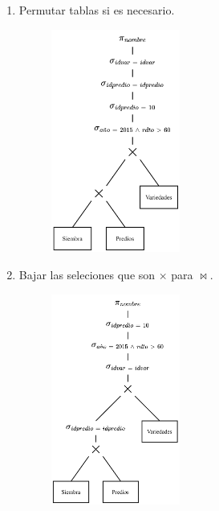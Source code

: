 \documentclass{templateNote}
\begin{document}
\begin{enumerate}
\begin{itemize}
\begin{enumerate}
            \newpage
            \item Permutar tablas si es necesario.
            \begin{figure}[H]
                \centering
                \includegraphics[width=0.4\textwidth]{img/E1-Paso-2.png}
            \end{figure}

            \item Bajar las seleciones que son $\times$ para $\Join$.
            \begin{figure}[H]
                \centering
                \includegraphics[width=0.4\textwidth]{img/E1-Paso-3.png}
            \end{figure}


\end{enumerate}
\end{itemize}
\end{enumerate}
\end{document}
